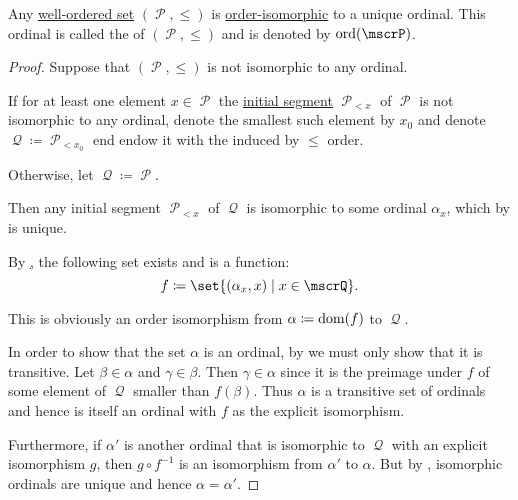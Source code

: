 \begin{proposition}\label{thm:order_type_existence}\cite[thm. 63.25]{OpenLogicFull}
  Any \hyperref[def:well_ordered_set]{well-ordered set} \( (\mscrP, \leq) \) is \hyperref[def:poset/homomorphism]{order-isomorphic} to a unique ordinal. This ordinal is called the  of \( (\mscrP, \leq) \) and is denoted by \( \ord(\mscrP) \).
\end{proposition}
\begin{proof}
  Suppose that \( (\mscrP, \leq) \) is not isomorphic to any ordinal.

  If for at least one element \( x \in \mscrP \) the \hyperref[def:poset_interval/ray]{initial segment} \( \mscrP_{<x} \) of \( \mscrP \) is not isomorphic to any ordinal, denote the smallest such element by \( x_0 \) and denote \( \mscrQ \coloneqq \mscrP_{<x_0} \) end endow it with the induced by \( \leq \) order.

  Otherwise, let \( \mscrQ \coloneqq \mscrP \).

  Then any initial segment \( \mscrP_{<x} \) of \( \mscrQ \) is isomorphic to some ordinal \( \alpha_x \), which by  is unique.

  By \hyperref[def:zfc/A8], the following set exists and is a function:
  \begin{equation*}
    f \coloneqq \set{ (\alpha_x, x) \given x \in \mscrQ }.
  \end{equation*}

  This is obviously an order isomorphism from \( \alpha \coloneqq \operatorname{dom}(f) \) to \( \mscrQ \).

  In order to show that the set \( \alpha \) is an ordinal, by  we must only show that it is transitive. Let \( \beta \in \alpha \) and \( \gamma \in \beta \). Then \( \gamma \in \alpha \) since it is the preimage under \( f \) of some element of \( \mscrQ \) smaller than \( f(\beta) \). Thus \( \alpha \) is a transitive set of ordinals and hence is itself an ordinal with \( f \) as the explicit isomorphism.

  Furthermore, if \( \alpha' \) is another ordinal that is isomorphic to \( \mscrQ \) with an explicit isomorphism \( g \), then \( g \circ f^{-1} \) is an isomorphism from \( \alpha' \) to \( \alpha \). But by , isomorphic ordinals are unique and hence \( \alpha = \alpha' \).
\end{proof}
